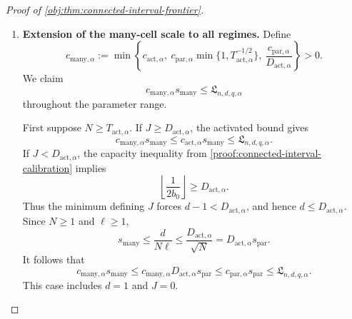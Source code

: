 \documentclass[11pt]{article}
\begin{document}
\begin{proof}[Proof of \cref{obj:thm:connected-interval-frontier}]
\begin{enumerate}
For any honest procedure \(\mathsf I\), coverage of each grid point is
at least \(\beta\) under its corresponding sample law. By
\cref{obj:lem:randomized-kernel-tv-comparison}, under the reference law
\(P_{1/2}\) each point is contained in the returned interval with
probability at least
\(\beta-\eta_{\mathrm{cell}}=7\beta/8\). A connected interval
containing a given number of grid points has length at least their
spacing times that number minus one. Summing the inclusion
probabilities therefore gives
\[
\begin{aligned}
E_{P_{1/2}}[\operatorname{length}(\mathsf I)]
&\ge
\delta_{\mathrm{cell}}
\left[(M_{\mathrm{cell},\alpha}+1)\frac{7\beta}{8}-1\right]\\
&\ge\frac{3\beta}{4}w_{\mathrm{cell}},
\end{aligned}
\]
because \(1/M_{\mathrm{cell},\alpha}\le\beta/8\).
All interval risks lie in \([0,2]\), and the constant interval
\([-1,1]\) is honest. Hence taking the supremum over models and the
infimum over honest procedures preserves this lower bound. Finally,
\[
c_{\mathrm{par},\alpha}s_{\mathrm{par}}
\le
\frac{3\beta}{4}\frac{\eta_{\mathrm{cell}}}{4}s_{\mathrm{par}}
\le
\frac{3\beta}{4}w_{\mathrm{cell}}
\le\mathfrak L_{n,d,q,\alpha},
\]
which proves the asserted explicit floor.

\item \textbf{Extension of the many-cell scale to all regimes.}
Define
\[
c_{\mathrm{many},\alpha}
:=
\min\left\{
c_{\mathrm{act},\alpha},
\ c_{\mathrm{par},\alpha}
       \min\{1,T_{\mathrm{act},\alpha}^{-1/2}\},
\ \frac{c_{\mathrm{par},\alpha}}{D_{\mathrm{act},\alpha}}
\right\}>0.
\]
We claim
\[
c_{\mathrm{many},\alpha}s_{\mathrm{many}}
\le\mathfrak L_{n,d,q,\alpha}
\]
throughout the parameter range.

First suppose \(N\ge T_{\mathrm{act},\alpha}\). If
\(J\ge D_{\mathrm{act},\alpha}\), the activated bound gives
\[
c_{\mathrm{many},\alpha}s_{\mathrm{many}}
\le c_{\mathrm{act},\alpha}s_{\mathrm{many}}
\le\mathfrak L_{n,d,q,\alpha}.
\]
If \(J<D_{\mathrm{act},\alpha}\), the capacity inequality from \cref{proof:connected-interval-calibration}
implies
\[
\left\lfloor\frac1{2b_0}\right\rfloor
\ge D_{\mathrm{act},\alpha}.
\]
Thus the minimum defining \(J\) forces
\(d-1<D_{\mathrm{act},\alpha}\), and hence
\(d\le D_{\mathrm{act},\alpha}\). Since \(N\ge1\) and \(\ell\ge1\),
\[
s_{\mathrm{many}}
\le\frac{d}{N\ell}
\le\frac{D_{\mathrm{act},\alpha}}{\sqrt N}
=
D_{\mathrm{act},\alpha}s_{\mathrm{par}}.
\]
It follows that
\[
c_{\mathrm{many},\alpha}s_{\mathrm{many}}
\le
c_{\mathrm{many},\alpha}D_{\mathrm{act},\alpha}s_{\mathrm{par}}
\le c_{\mathrm{par},\alpha}s_{\mathrm{par}}
\le\mathfrak L_{n,d,q,\alpha}.
\]
This case includes \(d=1\) and \(J=0\).


\end{enumerate}
\end{proof}
\end{document}
